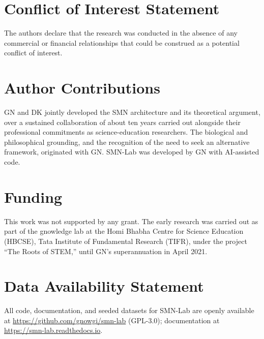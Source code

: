 \documentclass[utf8]{FrontiersinHarvard}
\begin{document}
\section*{Conflict of Interest Statement}
The authors declare that the research was conducted in the absence of any commercial or financial relationships that could be construed as a potential conflict of interest.

\section*{Author Contributions}
GN and DK jointly developed the SMN architecture and its theoretical argument, over a sustained collaboration of about ten years carried out alongside their professional commitments as science-education researchers. The biological and philosophical grounding, and the recognition of the need to seek an alternative framework, originated with GN. SMN-Lab was developed by GN with AI-assisted code.

\section*{Funding}
This work was not supported by any grant. The early research was carried out as part of the gnowledge lab at the Homi Bhabha Centre for Science Education (HBCSE), Tata Institute of Fundamental Research (TIFR), under the project ``The Roots of STEM,'' until GN's superannuation in April 2021.

\section*{Data Availability Statement}
All code, documentation, and seeded datasets for SMN-Lab are openly available at \url{https://github.com/gnowgi/smn-lab} (GPL-3.0); documentation at \url{https://smn-lab.readthedocs.io}.



\end{document}
